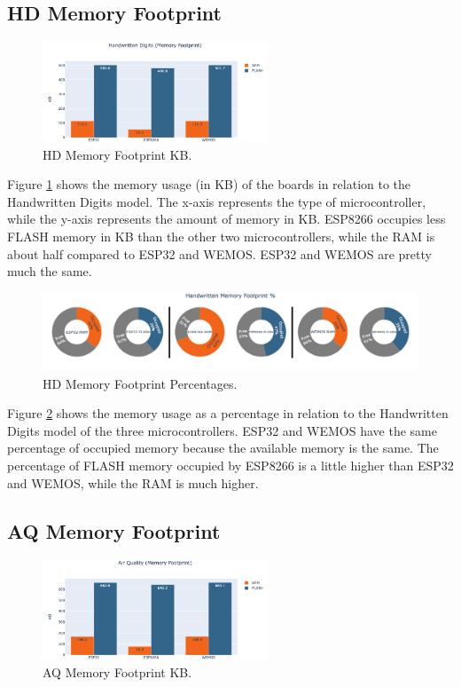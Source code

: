 \documentclass{article}
\begin{document}
\subsection{HD Memory Footprint}

\begin{figure}[H]
    \centering
    \includegraphics[width=0.6\textwidth]{HD-Mem-KB.png}
    \caption{HD Memory Footprint KB.}
    \label{fig:12}
\end{figure}

Figure \ref{fig:12} shows the memory usage (in KB) of the boards in relation to the Handwritten Digits model. The x-axis represents the type of microcontroller, while the y-axis represents the amount of memory in KB. ESP8266 occupies less FLASH memory in KB than the other two microcontrollers, while the RAM is about half compared to ESP32 and WEMOS. ESP32 and WEMOS are pretty much the same.

\begin{figure}[H]
    \centering
    \includegraphics[width=1.0\textwidth]{HD-Mem-perc.png}
    \caption{HD Memory Footprint Percentages.}
    \label{fig:13}
\end{figure}

Figure \ref{fig:13} shows the memory usage as a percentage in relation to the Handwritten Digits model of the three microcontrollers. ESP32 and WEMOS have the same percentage of occupied memory because the available memory is the same. The percentage of FLASH memory occupied by ESP8266 is a little higher than ESP32 and WEMOS, while the RAM is much higher.

\subsection{AQ Memory Footprint}

\begin{figure}[H]
    \centering
    \includegraphics[width=0.6\textwidth]{AQ-Mem-KB.png}
    \caption{AQ Memory Footprint KB.}
    \label{fig:14}
\end{figure}
\end{document}
